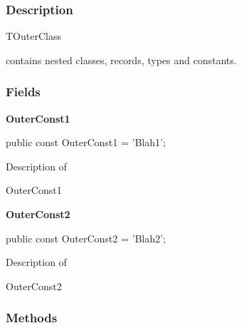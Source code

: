 \documentclass{report}
\newif\ifpdf
\begin{document}
\subsubsection*{\large{\textbf{Description}}\normalsize\hspace{1ex}\hfill}
\begin{ttfamily}TOuterClass\end{ttfamily} contains nested classes, records, types and constants.\subsubsection*{\large{\textbf{Fields}}\normalsize\hspace{1ex}\hfill}
\begin{list}{}{
\setlength{\itemindent}{0cm}
\setlength{\listparindent}{0cm}
\setlength{\leftmargin}{\evensidemargin}
\addtolength{\leftmargin}{\tmplength}
\settowidth{\labelsep}{X}
\addtolength{\leftmargin}{\labelsep}
\setlength{\labelwidth}{\tmplength}
}
\label{ok_nested_types.TOuterClass-OuterConst1}
\item[\textbf{OuterConst1}\hfill]
\ifpdf
\begin{flushleft}
\fi
\begin{ttfamily}
public const OuterConst1 = 'Blah1';\end{ttfamily}

\ifpdf
\end{flushleft}
\fi


\par Description of \begin{ttfamily}OuterConst1\end{ttfamily}\label{ok_nested_types.TOuterClass-OuterConst2}
\item[\textbf{OuterConst2}\hfill]
\ifpdf
\begin{flushleft}
\fi
\begin{ttfamily}
public const OuterConst2 = 'Blah2';\end{ttfamily}

\ifpdf
\end{flushleft}
\fi


\par Description of \begin{ttfamily}OuterConst2\end{ttfamily}\end{list}
\subsubsection*{\large{\textbf{Methods}}\normalsize\hspace{1ex}\hfill}
\end{document}
